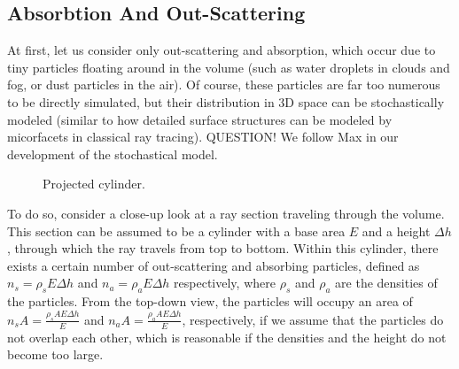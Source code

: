\subsection{Absorbtion And Out-Scattering}
At first, let us consider only out-scattering and absorption, which occur due to tiny particles floating around in the volume (such as water droplets in clouds and fog, or dust particles in the air).
Of course, these particles are far too numerous to be directly simulated, but their distribution in 3D space can be stochastically modeled (similar to how detailed surface structures can be modeled by micorfacets in classical ray tracing).
QUESTION!
We follow Max\cite{468400} in our development of the stochastical model.
\begin{figure}
\centering
\def\svgwidth{\columnwidth}


  \caption{\label{fig:cylinder}
         Projected cylinder.}
\end{figure}
To do so, consider a close-up look at a ray section traveling through the volume.
This section can be assumed to be a cylinder with a base area $E$ and a height $\Delta h$, through which the ray travels from top to bottom.
Within this cylinder, there exists a certain number of out-scattering and absorbing particles, defined as $n_s={\rho}_sE{\Delta}h$ and $n_a={\rho}_aE{\Delta}h$ respectively, where ${\rho}_s$ and ${\rho}_a$ are the densities of the particles.
From the top-down view, the particles will occupy an area of ${n_sA}=\frac{{\rho}_sAE{\Delta}h}{E}$ and ${n_aA}=\frac{{\rho}_aAE{\Delta}h}{E}$, respectively, if we assume that the particles do not overlap each other, which is reasonable if the densities and the height do not become too large.

